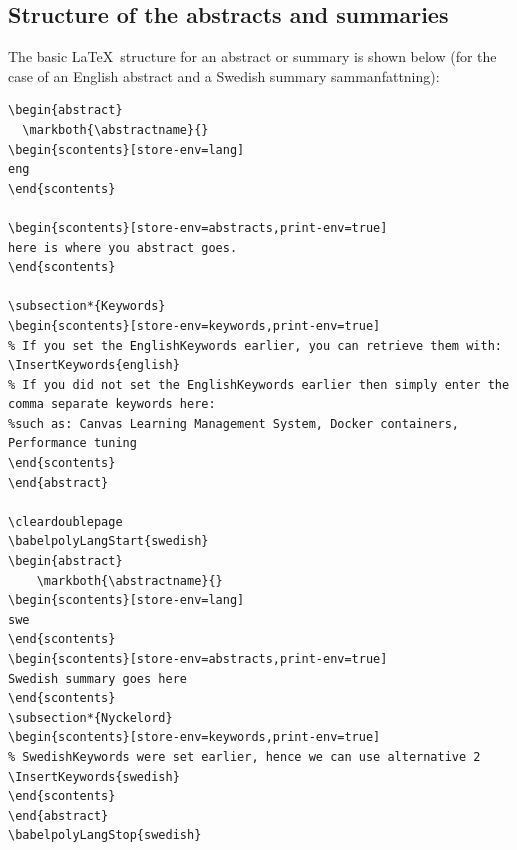 \documentclass[examplethesis.tex]{subfiles}
\begin{document}
\subsection{Structure of the abstracts and summaries}
The basic \LaTeX\  structure for an abstract or summary is shown below (for the case of an English abstract and a Swedish summary \ie sammanfattning):
\begin{lstlisting}[style=latexExampleForAuthors]
\begin{abstract}
  \markboth{\abstractname}{}
\begin{scontents}[store-env=lang]
eng
\end{scontents}

\begin{scontents}[store-env=abstracts,print-env=true]
here is where you abstract goes.
\end{scontents}

\subsection*{Keywords}
\begin{scontents}[store-env=keywords,print-env=true]
% If you set the EnglishKeywords earlier, you can retrieve them with:
\InsertKeywords{english}
% If you did not set the EnglishKeywords earlier then simply enter the comma separate keywords here:
%such as: Canvas Learning Management System, Docker containers, Performance tuning
\end{scontents}
\end{abstract}

\cleardoublepage
\babelpolyLangStart{swedish}
\begin{abstract}
    \markboth{\abstractname}{}
\begin{scontents}[store-env=lang]
swe
\end{scontents}
\begin{scontents}[store-env=abstracts,print-env=true]
Swedish summary goes here
\end{scontents}
\subsection*{Nyckelord}
\begin{scontents}[store-env=keywords,print-env=true]
% SwedishKeywords were set earlier, hence we can use alternative 2
\InsertKeywords{swedish}
\end{scontents}
\end{abstract}
\babelpolyLangStop{swedish}
\end{lstlisting}
\end{document}
